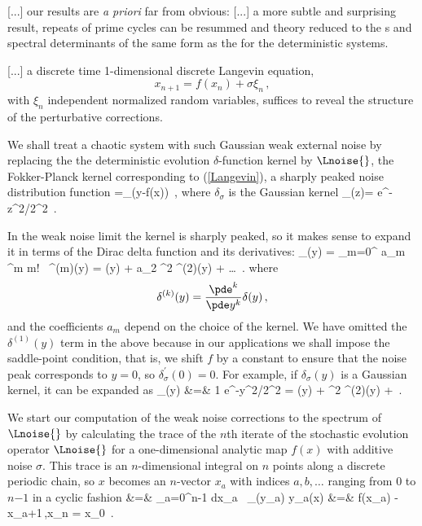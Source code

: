 [...] our results are {\em a priori} far from obvious:
[...]
a more subtle and surprising result,
repeats of prime cycles can be resummed and theory reduced to the
\dzeta s and {spec\-tral det\-er\-min\-ant}s of the same form as the for the deterministic
systems.

[...] a discrete time 1-dimensional
discrete Langevin equation,
\begin{equation}
x_{n+1}=f(x_n)+\sigma\xi_n
\,,\label{Langevin}
\end{equation}
with $\xi_n$ independent normalized
random variables,
suffices to reveal the structure of the perturbative corrections.

We shall treat a chaotic system with such Gaussian weak external noise by
replacing the the deterministic evolution $\delta$-function kernel
by $\Lnoise{}$,  the Fokker-Planck
kernel corresponding to (\ref{Langevin}),
a sharply peaked noise distribution function
\beq
\Lnoise{} =\delta_\sigma(y-f(x))
\,,
where  $\delta_\sigma$ is the Gaussian kernel
\beq
\delta_\sigma(z)= e^{-z^2/2\sigma^2}
\,.

In the weak noise limit the kernel is sharply peaked, so it
makes sense to expand it
in terms of the Dirac delta function and
its derivatives:
\beq
	\delta_\sigma(y)
	=
	\sum_{m=0}^{\infty} {a_m \sigma^m \over m!} \, \delta^{(m)}(y)
	=
	\delta(y) +
	a_2 {\sigma^2 } \delta^{(2)}(y) +
    \dots
	\,.
\label{delSigExp}
\eeq
where
\[
	\delta^{(k)}(y) = {\pde^k \over \pde y^k} \delta(y)
	\,,
\]
and the coefficients $a_m$ depend on the choice of the kernel.
We have omitted the $\delta^{(1)}(y)$ term in the above because
in our applications we shall impose
the saddle-point condition, that is,
we shift $f$ by a constant to ensure that the noise peak corresponds
to $y=0$, so $\delta_\sigma^{'}(0)=0$.
For example, if $\delta_\sigma(y)$ is a Gaussian kernel,
it can be expanded as
\bea
	\delta_\sigma(y)
	&=&
	{1 \over {}} e^{-{y^2/2\sigma^2} }
    =
	\delta(y) + {\sigma^2 } \delta^{(2)}(y)
     + \cdots
	\,.
\label{delGaussExp}
\eea

We start our computation of the weak noise corrections to the
spectrum of $\Lnoise{}$ by calculating the trace of the $n$th iterate of
the stochastic evolution operator $\Lnoise{}$
for a one-dimensional analytic
map $f(x)$ with additive noise $\sigma$.
This trace is an $n$-dimensional
integral on $n$ points along a discrete periodic chain,
so $x$ becomes an $n$-vector $x_a$ with indices $a,b,\ldots$
ranging from $0$ to $n$$-$$1$
in a cyclic fashion
\bea
{} &=& \int %
	\prod_{a=0}^{n-1} dx_a \, \delta_\sigma(y_a)
	\continue
y_a(x) &=& f(x_{a})  - x_{a+1}\,,\qquad x_n  =  x_0
\,.
\label{FatIntDef}
\eea


